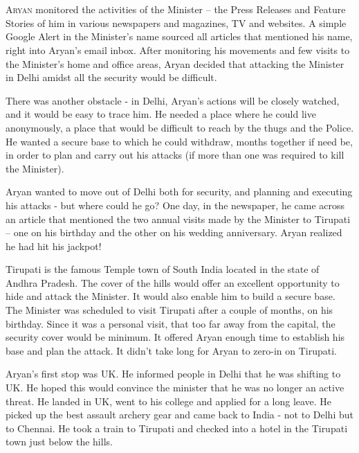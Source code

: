 \chapter{}

\lettrine{A}{ryan} monitored the activities of the Minister – the Press Releases and Feature
Stories of him in various newspapers and magazines, TV and websites. A simple
Google Alert in the Minister's name sourced all articles that mentioned his
name, right into Aryan's email inbox. After monitoring his movements and few
visits to the Minister's home and office areas, Aryan decided that attacking the
Minister in Delhi amidst all the security would be difficult.

There was another obstacle - in Delhi, Aryan's actions will be closely watched,
and it would be easy to trace him. He needed a place where he could live
anonymously, a place that would be difficult to reach by the thugs and the
Police. He wanted a secure base to which he could withdraw, months together if
need be, in order to plan and carry out his attacks (if more than one was
required to kill the Minister).

Aryan wanted to move out of Delhi both for security, and planning and executing
his attacks - but where could he go? One day, in the newspaper, he came across
an article that mentioned the two annual visits made by the Minister to Tirupati
– one on his birthday and the other on his wedding anniversary. Aryan realized
he had hit his jackpot!

Tirupati is the famous Temple town of South India located in the state of Andhra
Pradesh. The cover of the hills would offer an excellent opportunity to hide and
attack the Minister. It would also enable him to build a secure base. The
Minister was scheduled to visit Tirupati after a couple of months, on his
birthday. Since it was a personal visit, that too far away from the capital, the
security cover would be minimum. It offered Aryan enough time to establish his
base and plan the attack. It didn't take long for Aryan to zero-in on Tirupati.

Aryan's first stop was UK. He informed people in Delhi that he was shifting to
UK. He hoped this would convince the minister that he was no longer an active
threat. He landed in UK, went to his college and applied for a long leave. He
picked up the best assault archery gear and came back to India - not to Delhi
but to Chennai. He took a train to Tirupati and checked into a hotel in the
Tirupati town just below the hills.